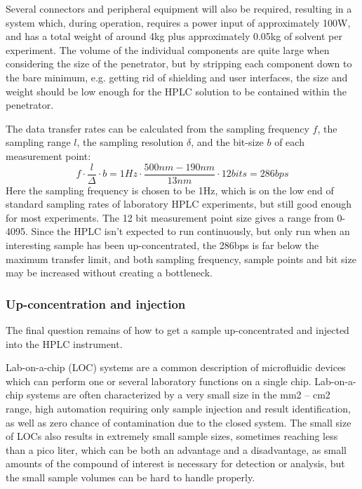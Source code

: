 Several connectors and peripheral equipment will also be required, resulting in a system which, during operation, requires a power input of approximately 100W, and has a total weight of around 4kg plus approximately 0.05kg of solvent per experiment. The volume of the individual components are quite large when considering the size of the penetrator, but by stripping each component down to the bare minimum, e.g. getting rid of shielding and user interfaces, the size and weight should be low enough for the HPLC solution to be contained within the penetrator. 

The data transfer rates can be calculated from the sampling frequency $f$, the sampling range $l$, the sampling resolution $\delta$, and the bit-size $b$ of each measurement point:
\begin{equation}
    f \cdot \frac{l}{\Delta} \cdot b = 1Hz \cdot \frac{500nm-190nm}{13nm} \cdot 12bits = 286bps
\end{equation}
Here the sampling frequency is chosen to be 1Hz, which is on the low end of standard sampling rates of laboratory HPLC experiments, but still good enough for most experiments. The 12 bit measurement point size gives a range from 0-4095. Since the HPLC isn’t expected to run continuously, but only run when an interesting sample has been up-concentrated, the 286bps is far below the maximum transfer limit, and both sampling frequency, sample points and bit size may be increased without creating a bottleneck.

\subsubsection{Up-concentration and injection}
The final question remains of how to get a sample up-concentrated and injected into the HPLC instrument.

Lab-on-a-chip (LOC) systems are a common description of microfluidic devices which can perform one or several laboratory functions on a single chip. Lab-on-a-chip systems are often characterized by a very small size in the mm2 – cm2 range, high automation requiring only sample injection and result identification, as well as zero chance of contamination due to the closed system. The small size of LOCs also results in extremely small sample sizes, sometimes reaching less than a pico liter, which can be both an advantage and a disadvantage, as small amounts of the compound of interest is necessary for detection or analysis, but the small sample volumes can be hard to handle properly. 

